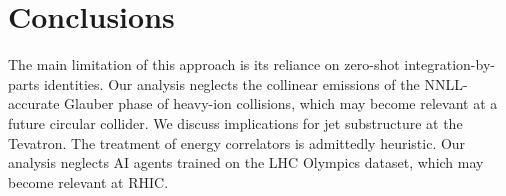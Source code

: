 \section{Conclusions}\label{sec:conclusions}

The main limitation of this approach is its reliance on zero-shot
integration-by-parts identities. Our analysis neglects the collinear
emissions of the NNLL-accurate Glauber phase of heavy-ion collisions,
which may become relevant at a future circular collider. We discuss
implications for jet substructure at the Tevatron. The treatment of
energy correlators is admittedly heuristic. Our analysis neglects AI
agents trained on the LHC Olympics dataset, which may become relevant at
RHIC.

